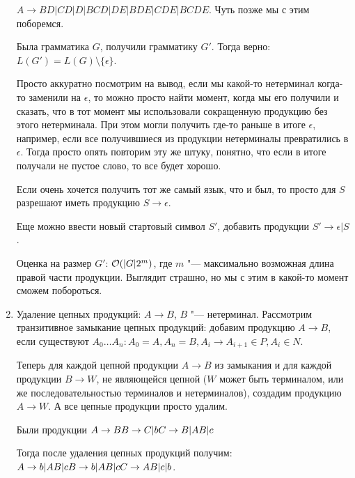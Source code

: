 \begin{enumerate}
\begin{Rem}
$A \to BD | CD | D | BCD | DE | BDE | CDE | BCDE$. 
Чуть позже мы с этим поборемся.
\end{Rem}

Была грамматика $G$, получили грамматику $G'$. Тогда верно: $L(G') = L(G) \setminus \{\epsilon\}$.

Просто аккуратно посмотрим на вывод, если мы какой-то нетерминал когда-то заменили на $\epsilon$, то можно просто найти момент, когда мы его получили и сказать, что в тот момент
мы использовали сокращенную продукцию без этого нетерминала.
При этом могли получить где-то раньше в итоге $\epsilon$, например, если все получившиеся из продукции нетерминалы превратились в $\epsilon$. 
Тогда просто опять повторим эту же штуку, понятно, что если в итоге получали не пустое слово, то все будет хорошо.

\begin{Rem}
Если очень хочется получить тот же самый язык, что и был, то просто для $S$ разрешают иметь продукцию $S \to \epsilon$.

Еще можно ввести новый стартовый символ $S'$, добавить продукции $S' \to \epsilon|S$.
\end{Rem}

Оценка на размер $G'$: $\mathcal{O}(|G| 2^{m})$, где $m$ "--- максимально возможная длина правой части продукции.
Выглядит страшно, но мы с этим в какой-то момент сможем побороться.

\item
Удаление цепных продукций: $A \to B$, $B$ "--- нетерминал.
Рассмотрим транзитивное замыкание цепных продукций: добавим продукцию $A \to B$, если существуют $A_0 \dots A_n\colon A_0 = A, A_n = B, A_i \to A_{i + 1} \in P, A_i \in N$.

Теперь для каждой цепной продукции $A \to B$ из замыкания и для каждой продукции $B \to W$, не являющейся цепной 
($W$ может быть терминалом, или же последовательностью терминалов и нетерминалов), создадим продукцию $A \to W$.
А все цепные продукции просто удалим.

\begin{exmp}
Были продукции $\\
A \to B \\
B \to C | b \\
C \to B | AB | c 
$

Тогда после удаления цепных продукций получим: $\\
A \to b | AB | c \\
B \to b | AB | c \\
C \to AB | c | b
$.


\end{exmp}
\end{enumerate}
